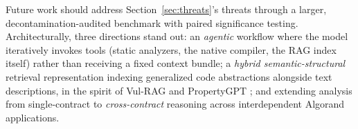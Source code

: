 \documentclass[lettersize,journal]{IEEEtran}
\begin{document}
Future work should address Section~\ref{sec:threats}'s threats through a larger,
decontamination-audited benchmark with paired significance testing. Architecturally, three
directions stand out: an \emph{agentic} workflow where the model iteratively invokes tools (static
analyzers, the native compiler, the RAG index itself) rather than receiving a fixed context bundle;
a \emph{hybrid semantic-structural} retrieval representation indexing generalized code abstractions
alongside text descriptions, in the spirit of Vul-RAG \cite{vulrag2024} and PropertyGPT
\cite{propertygpt2025}; and extending analysis from single-contract to \emph{cross-contract}
reasoning across interdependent Algorand applications.





\end{document}
